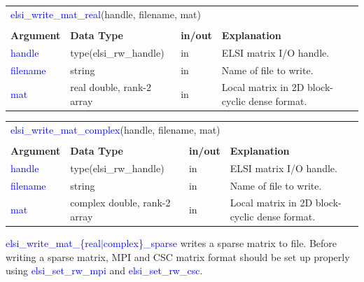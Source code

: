 \documentclass{report}
\newcommand{\tcb}[1]{\textcolor{blue}{#1}}
\begin{document}
\begin{tabular}[]{|p{20mm}|p{45mm}|p{15mm}|p{85mm}|}
\multicolumn{4}{l}{\tcb{elsi\_write\_mat\_real}(handle, filename, mat)}\\
\multicolumn{4}{l}{}\\
\hline
\multicolumn{1}{|l|}{\textbf{Argument}} & \multicolumn{1}{l|}{\textbf{Data Type}} & \multicolumn{1}{l|}{\textbf{in/out}} & \multicolumn{1}{l|}{\textbf{Explanation}}\\
\hline
\tcb{handle}   & type(elsi\_rw\_handle)    & in & ELSI matrix I/O handle.\\
\hline
\tcb{filename} & string                    & in & Name of file to write.\\
\hline
\tcb{mat}      & real double, rank-2 array & in & Local matrix in 2D block-cyclic dense format.\\
\hline
\end{tabular}

\begin{tabular}[]{|p{20mm}|p{45mm}|p{15mm}|p{85mm}|}
\multicolumn{4}{l}{\tcb{elsi\_write\_mat\_complex}(handle, filename, mat)}\\
\multicolumn{4}{l}{}\\
\hline
\multicolumn{1}{|l|}{\textbf{Argument}} & \multicolumn{1}{l|}{\textbf{Data Type}} & \multicolumn{1}{l|}{\textbf{in/out}} & \multicolumn{1}{l|}{\textbf{Explanation}}\\
\hline
\tcb{handle}   & type(elsi\_rw\_handle)       & in & ELSI matrix I/O handle.\\
\hline
\tcb{filename} & string                       & in & Name of file to write.\\
\hline
\tcb{mat}      & complex double, rank-2 array & in & Local matrix in 2D block-cyclic dense format.\\
\hline
\end{tabular}

\tcb{elsi\_write\_mat\_\{real$\vert$complex\}\_sparse} writes a sparse matrix to file. Before writing a sparse matrix, MPI and CSC matrix format should be set up properly using \tcb{elsi\_set\_rw\_mpi} and \tcb{elsi\_set\_rw\_csc}.
\end{document}
